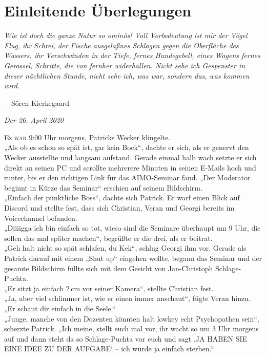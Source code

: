 \documentclass[oneside]{memoir}
\makeatletter
\newenvironment{chapquote}[2][2em]
  {\setlength{\@tempdima}{#1}%
   \def\chapquote@author{#2}%
   \parshape 1 \@tempdima \dimexpr\textwidth-2\@tempdima\relax%
   \itshape}
  {\par\normalfont\hfill--\ \chapquote@author\hspace*{\@tempdima}\par\bigskip}
\makeatother
\begin{document}
\chapter{Einleitende Überlegungen} %
\begin{chapquote}{Sören Kierkegaard}
\glqq Wie ist doch die ganze Natur so ominös! Voll Vorbedeutung ist mir der Vögel Flug, ihr Schrei, der Fische ausgelaßnes Schlagen gegen die Oberfläche des Wassers, ihr Verschwinden in der Tiefe, fernes Hundegebell, eines Wagens fernes Gerassel, Schritte, die von fernher widerhallen. Nicht sehe ich Gespenster in dieser nächtlichen Stunde, nicht sehe ich, was war, sondern das, was kommen wird.\grqq
\end{chapquote}

\bigskip
\textit{Der 26. April 2020} 

\medskip
\lettrine{E}{s war} 9:00 Uhr morgens, Patricks Wecker klingelte. \\
„Als ob es schon so spät ist, gar kein Bock“, dachte er sich, als er genervt den Wecker ausstellte und langsam aufstand. Gerade einmal halb wach setzte er sich direkt an seinen PC und scrollte mehrerere Minuten in seinen E-Mails hoch und runter, bis er den richtigen Link für das AIMO-Seminar fand. „Der Moderator beginnt in Kürze das Seminar“ erschien auf seinem Bildschirm. \\
„Einfach der pünktliche Boss“, dachte sich Patrick. Er warf einen Blick auf Discord und stellte fest, dass sich Christian, Veran und Georgi bereits im Voicechannel befanden. \\
„Diiiigga ich bin einfach so tot, wieso sind die Seminare überhaupt um 9 Uhr, die sollen das mal später machen“, begrüßte er die drei, als er beitrat. \\
„Geh halt nicht so spät schlafen, du Kek“, schlug Georgi ihm vor. Gerade als Patrick darauf mit einem „Shut up“ eingehen wollte, begann das Seminar und der gesamte Bildschirm füllte sich mit dem Gesicht von Jan-Christoph Schlage-Puchta. \\
„Er sitzt ja einfach 2\,cm vor seiner Kamera“, stellte Christian fest. \\
„Ja, aber viel schlimmer ist, wie er einen immer anschaut“, fügte Veran hinzu. „Er schaut dir einfach in die Seele.“ \\
„Junge, manche von den Dozenten könnten halt lowkey echt Psychopathen sein“, scherzte Patrick. „Ich meine, stellt euch mal vor, ihr wacht so um 3 Uhr morgens auf und dann steht da so Schlage-Puchta vor euch und sagt ‚JA HABEN SIE EINE IDEE ZU DER AUFGABE‘ -- ich würde ja einfach sterben.“ \\
\end{document}
